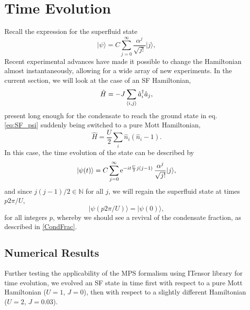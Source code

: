 \chapter{Time Evolution}
Recall the expression for the superfluid state
\begin{equation}\label{eq:SF_psi}
\lvert \psi \rangle = C \sum_{j=0}^{\infty} \frac{\alpha^j}{\sqrt{j!}}\lvert j\rangle,
\end{equation}
Recent experimental advances have made it possible to change the Hamiltonian almost instantaneously, allowing for a wide array of new experiments. In the current section, we will look at the case of an SF Hamiltonian,
\begin{equation}\label{eq:SF_ham}
\hat{H} = -J \sum_{\braket{i,j}} \hat{a}_{i}^{\dag} \hat{a}_j,
\end{equation}
 present long enough for the condensate to reach the ground state in eq. \ref{eq:SF_psi} suddenly being switched to a pure Mott Hamiltonian,
\begin{equation}
 \hat{H} = \frac{U}{2} \sum_{i} \hat{n}_i \left( \hat{n}_i -1 \right).
\end{equation}
%
In this case, the time evolution of the state can be described by
\begin{equation}
\lvert \psi (t) \rangle = C \sum_{j=0}^{\infty} \operatorname{e}^{-it \frac{U}{2} j(j-1)}\frac{\alpha^j}{\sqrt{j!}}\lvert j\rangle,
\end{equation}
and since $j(j-1)/2\in \mathbb{N}$ for all $j$, we will regain the superfluid state at times $p2\pi/U$,
\begin{equation}
\lvert \psi (p2\pi/U) \rangle = \lvert \psi (0) \rangle,
\end{equation}
for all integers $p$, whereby we should see a revival of the condensate fraction, as described in \ref{CondFrac}.

\section{Numerical Results}
Further testing the applicability of the MPS formalism using ITensor library for time evolution, we evolved an SF state in time first with respect to a pure Mott Hamiltonian ($U=1$, $J=0$), then with respect to a slightly different Hamiltonian ($U=2$, $J=0.03$).


